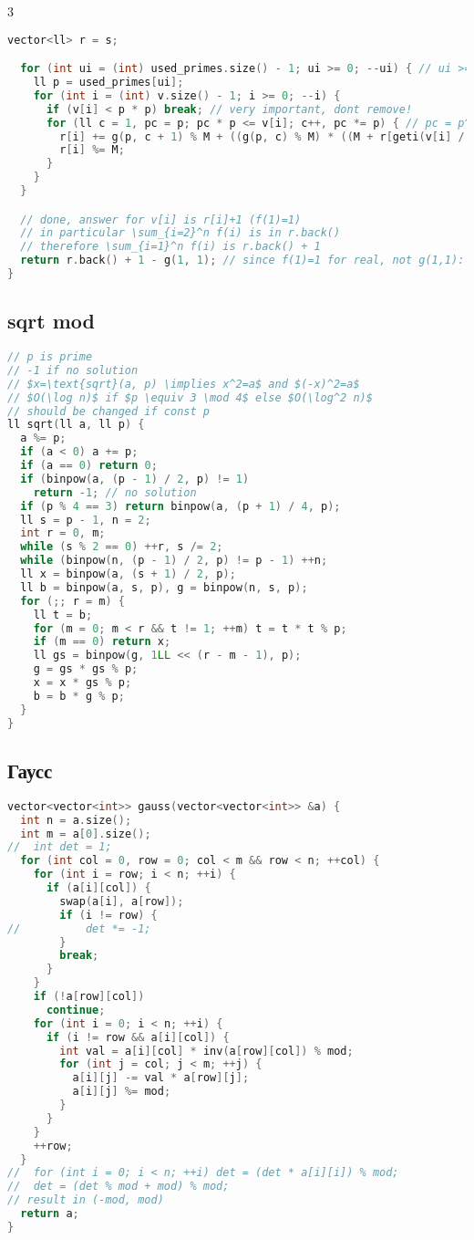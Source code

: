 \documentclass[9pt,a4paper,landscape,twosided]{extarticle}
\begin{document}
\begin{multicols*}{3}
\begin{lstlisting}[language=C++]
  vector<ll> r = s;

  for (int ui = (int) used_primes.size() - 1; ui >= 0; --ui) { // ui >= 1, sum for odd numbers only
    ll p = used_primes[ui];
    for (int i = (int) v.size() - 1; i >= 0; --i) {
      if (v[i] < p * p) break; // very important, dont remove!
      for (ll c = 1, pc = p; pc * p <= v[i]; c++, pc *= p) { // pc = p^c
        r[i] += g(p, c + 1) % M + ((g(p, c) % M) * ((M + r[geti(v[i] / pc)] - s[geti(p)]) % M)) % M;
        r[i] %= M;
      }
    }
  }

  // done, answer for v[i] is r[i]+1 (f(1)=1)
  // in particular \sum_{i=2}^n f(i) is in r.back()
  // therefore \sum_{i=1}^n f(i) is r.back() + 1
  return r.back() + 1 - g(1, 1); // since f(1)=1 for real, not g(1,1): 1 is not prime
}
\end{lstlisting}

\subsection{sqrt mod}
\begin{lstlisting}[language=C++]
// p is prime
// -1 if no solution
// $x=\text{sqrt}(a, p) \implies x^2=a$ and $(-x)^2=a$
// $O(\log n)$ if $p \equiv 3 \mod 4$ else $O(\log^2 n)$
// should be changed if const p
ll sqrt(ll a, ll p) {
  a %= p;
  if (a < 0) a += p;
  if (a == 0) return 0;
  if (binpow(a, (p - 1) / 2, p) != 1)
    return -1; // no solution
  if (p % 4 == 3) return binpow(a, (p + 1) / 4, p);
  ll s = p - 1, n = 2;
  int r = 0, m;
  while (s % 2 == 0) ++r, s /= 2;
  while (binpow(n, (p - 1) / 2, p) != p - 1) ++n;
  ll x = binpow(a, (s + 1) / 2, p);
  ll b = binpow(a, s, p), g = binpow(n, s, p);
  for (;; r = m) {
    ll t = b;
    for (m = 0; m < r && t != 1; ++m) t = t * t % p;
    if (m == 0) return x;
    ll gs = binpow(g, 1LL << (r - m - 1), p);
    g = gs * gs % p;
    x = x * gs % p;
    b = b * g % p;
  }
}

\end{lstlisting}

\subsection{Гаусс}
\begin{lstlisting}[language=C++]
vector<vector<int>> gauss(vector<vector<int>> &a) {
  int n = a.size();
  int m = a[0].size();
//  int det = 1;
  for (int col = 0, row = 0; col < m && row < n; ++col) {
    for (int i = row; i < n; ++i) {
      if (a[i][col]) {
        swap(a[i], a[row]);
        if (i != row) {
//          det *= -1;
        }
        break;
      }
    }
    if (!a[row][col])
      continue;
    for (int i = 0; i < n; ++i) {
      if (i != row && a[i][col]) {
        int val = a[i][col] * inv(a[row][col]) % mod;
        for (int j = col; j < m; ++j) {
          a[i][j] -= val * a[row][j];
          a[i][j] %= mod;
        }
      }
    }
    ++row;
  }
//  for (int i = 0; i < n; ++i) det = (det * a[i][i]) % mod;
//  det = (det % mod + mod) % mod;
// result in (-mod, mod)
  return a;
}


\end{lstlisting}
\end{multicols*}
\end{document}

